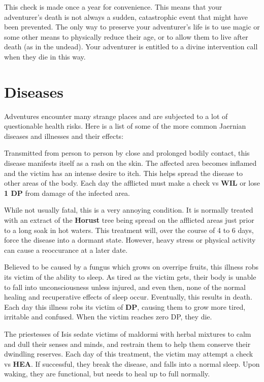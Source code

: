 \begin{multicols*}{2}
This check is made once a year for convenience. This means that your adventurer's death is not always a sudden, catastrophic event that might have been prevented. The only way to preserve your adventurer's life is to use magic or some other means to physically reduce their age, or to allow them to live after death (as in the undead). Your adventurer is entitled to a divine intervention call when they die in this way.
\section{Diseases}
Adventures encounter many strange places and are subjected to a lot of questionable health risks. Here is a list of some of the more common Jaernian diseases and illnesses and their effects:

 Transmitted from person to person by close and prolonged bodily contact, this disease manifests itself as a rash on the skin. The affected area becomes inflamed and the victim has an intense desire to itch. This helps spread the disease to other areas of the body. Each day the afflicted must make a  check vs \textbf{WIL} or lose \textbf{1 DP} from damage of the infected area. 

While not usually fatal, this is a very annoying condition. It is normally treated with an extract of the \textbf{Horust} tree being spread on the afflicted areas just prior to a long soak in hot waters. This treatment will, over the course of 4 to 6 days, force the disease into a dormant state. However, heavy stress or physical activity can cause a reoccurance at a later date.

 Believed to be caused by a fungus which grows on overripe fruits, this illness robs its victim of the ability to sleep. As tired as the victim gets, their body is unable to fall into unconsciousness unless injured, and even then, none of the normal healing and recuperative effects of sleep occur. Eventually, this results in death. Each day this illness robs its victim of  \textbf{DP}, causing them to grow more tired, irritable and confused. When the victim reaches zero DP, they die.

The priestesses of Isis sedate victims of maldormi with herbal mixtures to calm and dull their senses and minds, and restrain them to help them conserve their dwindling reserves. Each day of this treatment, the victim may attempt a  check vs \textbf{HEA}. If successful, they break the disease, and falls into a normal sleep. Upon waking, they are functional, but needs to heal up to full normally.


\end{multicols*}
